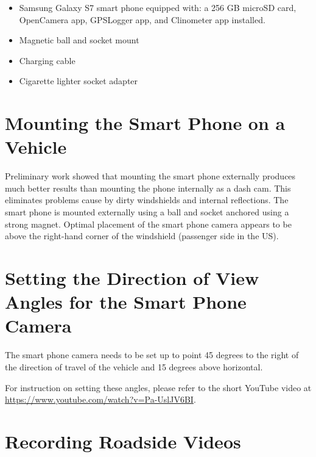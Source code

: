 \documentclass[12pt,letterpaper,english,bibliography=totocnumbered, abstract=on]{scrartcl}
\begin{document}
\begin{itemize}
	\item Samsung Galaxy S7 smart phone equipped with: a 256 GB microSD card, OpenCamera app, GPSLogger app, and Clinometer app installed. 
	\item Magnetic ball and socket mount
	\item Charging cable
	\item Cigarette lighter socket adapter
\end{itemize}

\section{Mounting the Smart Phone on a Vehicle}

Preliminary work showed that mounting the smart phone externally produces much better results than mounting the phone internally as a dash cam. This eliminates problems cause by dirty windshields and internal reflections. The smart phone is mounted externally using a ball and socket anchored using a strong magnet. Optimal placement of the smart phone camera appears to be above the right-hand corner of the windshield (passenger side in the US). 

\section{Setting the Direction of View Angles for the Smart Phone Camera}

The smart phone camera needs to be set up to point 45 degrees to the right of the direction of travel of the vehicle and 15 degrees above horizontal. 

For instruction on setting these angles, please refer to the short YouTube video at\\ \url{https://www.youtube.com/watch?v=Pa-UslJV6BI}.

\section{Recording Roadside Videos}
\end{document}

